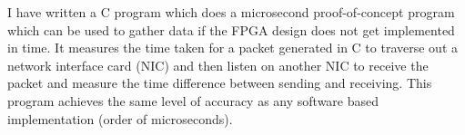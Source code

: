 \par I have written a C program which does a microsecond proof-of-concept program which can be used
to gather data if the FPGA design does not get implemented in time. It measures the time taken for a
packet generated in C to traverse out a network interface card (NIC) and then listen on another NIC
to receive the packet and measure the time difference between sending and receiving. This program
achieves the same level of accuracy as any software based implementation (order of microseconds).

